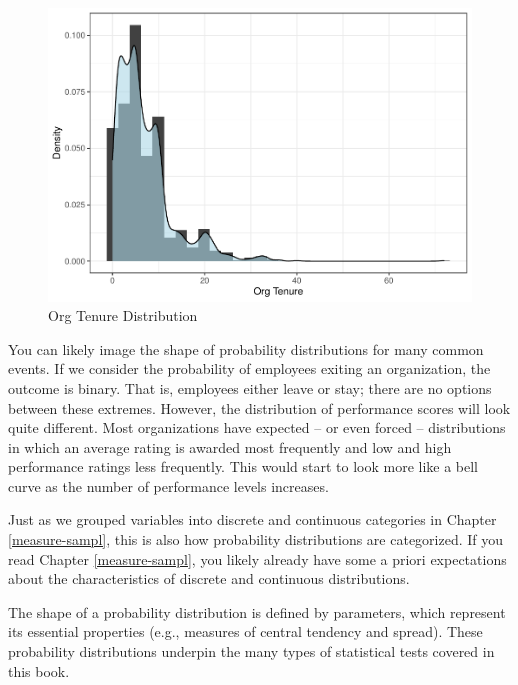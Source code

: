 \documentclass[
]{book}
\begin{document}
\begin{figure}

{\centering \includegraphics{People_Analytics_Lifecycle_files/figure-latex/org-tenure-dist-1} 

}

\caption{Org Tenure Distribution}\label{fig:org-tenure-dist}
\end{figure}

You can likely image the shape of probability distributions for many common events. If we consider the probability of employees exiting an organization, the outcome is binary. That is, employees either leave or stay; there are no options between these extremes. However, the distribution of performance scores will look quite different. Most organizations have expected -- or even forced -- distributions in which an average rating is awarded most frequently and low and high performance ratings less frequently. This would start to look more like a bell curve as the number of performance levels increases.

Just as we grouped variables into discrete and continuous categories in Chapter \ref{measure-sampl}, this is also how probability distributions are categorized. If you read Chapter \ref{measure-sampl}, you likely already have some a priori expectations about the characteristics of discrete and continuous distributions.

The shape of a probability distribution is defined by parameters, which represent its essential properties (e.g., measures of central tendency and spread). These probability distributions underpin the many types of statistical tests covered in this book.
\end{document}
